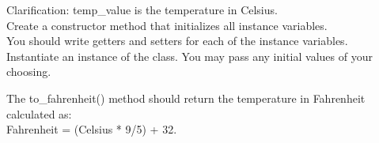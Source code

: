 \documentclass{article}
\newcommand{\tab}{\hspace*{0.25in}}
\begin{document}
\begin{enumerate}
	\vspace*{2ex}
	Clarification: temp\_value is the temperature in Celsius.\\
	Create a constructor method that initializes all instance variables.\\
	You should write getters and setters for each of the instance variables.\\
	Instantiate an instance of the class. You may pass any initial values of your choosing.
	
	The to\_fahrenheit() method should return the temperature in Fahrenheit calculated as:\\
	Fahrenheit = (Celsius * 9/5) + 32.\



\end{enumerate}
\pagebreak
\end{document}
